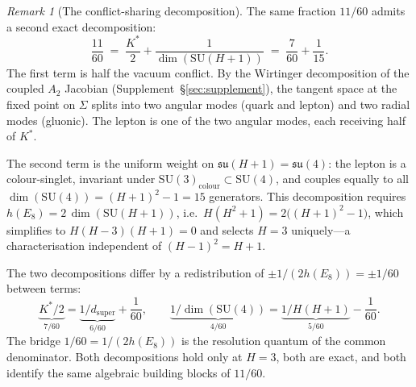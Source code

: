 \documentclass[11pt,a4paper]{article}
\theoremstyle{definition}
\theoremstyle{remark}
\newtheorem{remark}[theorem]{Remark}
\newcommand{\SU}{\mathrm{SU}}
\newcommand{\su}{\mathfrak{su}}
\begin{document}
\begin{remark}[The conflict-sharing decomposition]\label{rem:conflict_sharing}
The same fraction $11/60$ admits a second exact decomposition:
\begin{equation}\label{eq:11_60_conflict}
\frac{11}{60} \;=\; \frac{K^*}{2}+\frac{1}{\dim(\SU(H\!+\!1))} \;=\; \frac{7}{60}+\frac{1}{15}.
\end{equation}
The first term is half the vacuum conflict. By the Wirtinger decomposition of the coupled $A_2$ Jacobian (Supplement~\S\ref{sec:supplement}), the tangent space at the fixed point on $\Sigma$ splits into two angular modes (quark and lepton) and two radial modes (gluonic). The lepton is one of the two angular modes, each receiving half of $K^*$.

The second term is the uniform weight on $\su(H\!+\!1)=\su(4)$: the lepton is a colour-singlet, invariant under $\SU(3)_{\mathrm{colour}}\subset\SU(4)$, and couples equally to all $\dim(\SU(4))=(H\!+\!1)^2\!-\!1=15$ generators. This decomposition requires $h(E_8)=2\,\dim(\SU(H\!+\!1))$, i.e.\ $H(H^2+1)=2\bigl((H\!+\!1)^2-1\bigr)$, which simplifies to $H(H\!-\!3)(H\!+\!1)=0$ and selects $H=3$ uniquely---a characterisation independent of $(H\!-\!1)^2=H\!+\!1$.

The two decompositions differ by a redistribution of $\pm 1/(2h(E_8))=\pm 1/60$ between terms:
\[
\underbrace{K^*/2}_{7/60}=\underbrace{1/d_{\mathrm{super}}}_{6/60}+\frac{1}{60},\qquad
\underbrace{1/\dim(\SU(4))}_{4/60}=\underbrace{1/H(H\!+\!1)}_{5/60}-\frac{1}{60}.
\]
The bridge $1/60=1/(2h(E_8))$ is the resolution quantum of the common denominator. Both decompositions hold only at $H=3$, both are exact, and both identify the same algebraic building blocks of $11/60$.
\end{remark}
\end{document}
